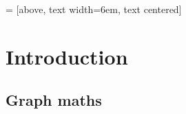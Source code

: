 \documentclass{article}
\begin{document}
 = [above, text width=6em, text centered]

\section*{Introduction}

\renewcommand{\dots}{\ \dotfill{}\ } 
\newcommand{\command}[2]{#1~\dotfill{}~#2\\} 
\newcommand{\defin}[2]{#1~\dotfill{}~#2\\} 

\subsection{Graph maths}
\end{document}
